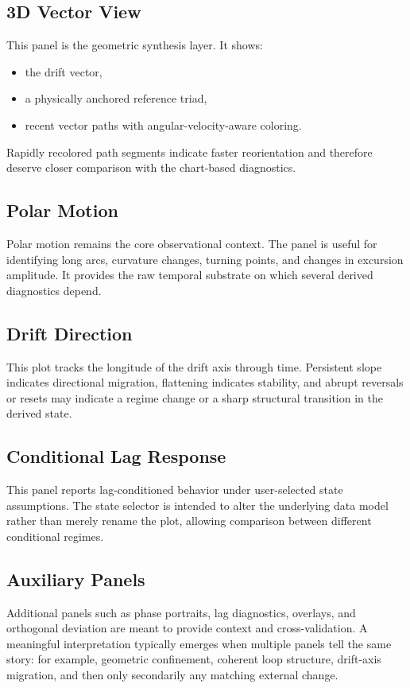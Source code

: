 \documentclass[11pt]{article}
\begin{document}
\subsection{3D Vector View}
This panel is the geometric synthesis layer. It shows:
\begin{itemize}[leftmargin=1.5em]
  \item the drift vector,
  \item a physically anchored reference triad,
  \item recent vector paths with angular-velocity-aware coloring.
\end{itemize}

Rapidly recolored path segments indicate faster reorientation and therefore deserve closer comparison with the chart-based diagnostics.

\subsection{Polar Motion}
Polar motion remains the core observational context. The panel is useful for identifying long arcs, curvature changes, turning points, and changes in excursion amplitude. It provides the raw temporal substrate on which several derived diagnostics depend.

\subsection{Drift Direction}
This plot tracks the longitude of the drift axis through time. Persistent slope indicates directional migration, flattening indicates stability, and abrupt reversals or resets may indicate a regime change or a sharp structural transition in the derived state.

\subsection{Conditional Lag Response}
This panel reports lag-conditioned behavior under user-selected state assumptions. The state selector is intended to alter the underlying data model rather than merely rename the plot, allowing comparison between different conditional regimes.

\subsection{Auxiliary Panels}
Additional panels such as phase portraits, lag diagnostics, overlays, and orthogonal deviation are meant to provide context and cross-validation. A meaningful interpretation typically emerges when multiple panels tell the same story: for example, geometric confinement, coherent loop structure, drift-axis migration, and then only secondarily any matching external change.
\end{document}
